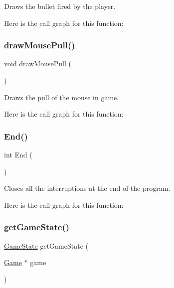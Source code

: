 Draws the bullet fired by the player. 

Here is the call graph for this function\+:
\mbox{\label{group__game_ga072809b49225566117672a2ec734b2cc}} 
\subsubsection{\texorpdfstring{drawMousePull()}{drawMousePull()}}
{\footnotesize\ttfamily void draw\+Mouse\+Pull (\begin{DoxyParamCaption}{ }\end{DoxyParamCaption})}



Draws the pull of the mouse in game. 

Here is the call graph for this function\+:
\mbox{\label{group__game_ga96a7acaf9d49759e564f941afcd87b68}} 
\subsubsection{\texorpdfstring{End()}{End()}}
{\footnotesize\ttfamily int End (\begin{DoxyParamCaption}{ }\end{DoxyParamCaption})}



Closes all the interruptions at the end of the program. 

Here is the call graph for this function\+:
\mbox{\label{group__game_gaf4496cd5f0ca56890acbe30e9f10e438}} 
\subsubsection{\texorpdfstring{getGameState()}{getGameState()}}
{\footnotesize\ttfamily \mbox{\hyperlink{group__game_ga7899b65f1ea0f655e4bbf8d2a5714285}{Game\+State}} get\+Game\+State (\begin{DoxyParamCaption}\item[{\mbox{\hyperlink{struct_game}{Game}} $\ast$}]{game }\end{DoxyParamCaption})}

\mbox{\label{group__game_ga5b0e92642a5a6f7584bf752ebf7d91e6}} 
